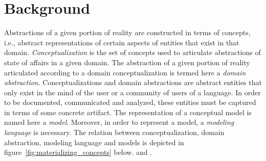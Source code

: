 \documentclass[
  10pt,				%
  oneside,
  a4paper,			%
  brazilian,
  english
]{abntex2}
\begin{document}
%

\section{Background}




Abstractions of a given portion of reality are constructed in terms of
concepts, i.e., abstract representations of certain aspects of entities that
exist in that domain.
%
\emph{Conceptualization} is the set of concepts used to articulate abstractions
of state of affairs in a given domain. The abstraction of a given portion of
reality articulated according to a domain conceptualization is termed here a
\emph{domain abstraction}.
%
Conceptualizations and domain abstractions are abstract entities that only exist
in the mind of the user or a community of users of a language. In order to be
documented, communicated and analyzed, these entities must be captured
in terms of some concrete artifact.
%
The representation of a conceptual model is named here a \emph{model}.
Moreover, in order to represent a model, a \emph{modeling language} is necessary.
%
The relation between conceptualization, domain abstraction, modeling language and
models is depicted in figure~\ref{fig:materializing_concepts} below.
\cite{carraretto10} and \cite{guizzardi05}.
\end{document}
